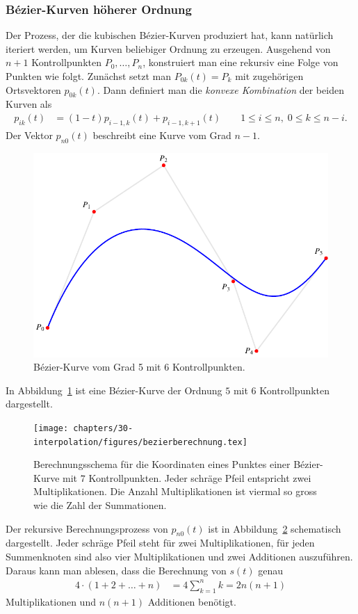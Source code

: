 \subsubsection{Bézier-Kurven höherer Ordnung}
%
Der Prozess, der die kubischen Bézier-Kurven produziert hat, kann natürlich
iteriert werden, um Kurven beliebiger Ordnung zu erzeugen.
Ausgehend von $n+1$ Kontrollpunkten $P_0,\dots,P_n$, konstruiert man eine
rekursiv eine Folge von Punkten wie folgt.
Zunächst setzt man $P_{0k}(t) = P_k$ mit zugehörigen Ortsvektoren $p_{0k}(t)$.
Dann definiert man die {\em konvexe Kombination} der beiden Kurven als
\begin{align*}
p_{ik}(t) &= (1-t)  p_{i-1,k}(t) + p_{i-1,k+1}(t)
\qquad
1\le i \le n,\; 
0\le k\le n - i.
\end{align*}
Der Vektor $p_{n0}(t)$ beschreibt eine Kurve vom Grad $n-1$.
\begin{figure}
\centering
\includegraphics{chapters/30-interpolation/figures/beziern.pdf}
\caption{Bézier-Kurve vom Grad 5 mit 6 Kontrollpunkten.
\label{buch:bezier:figure:beziern}}
\end{figure}
In Abbildung~\ref{buch:bezier:figure:beziern} ist eine Bézier-Kurve
der Ordnung $5$ mit 6 Kontrollpunkten dargestellt.

\begin{figure}
\centering
\texttt{[image: chapters/30-interpolation/figures/bezierberechnung.tex]}
\caption{Berechnungsschema für die Koordinaten eines Punktes einer Bézier-Kurve
mit $7$ Kontrollpunkten.
Jeder schräge Pfeil entspricht zwei Multiplikationen.
Die Anzahl Multiplikationen ist viermal so gross wie die Zahl der Summationen.
\label{buch:bezier:figure:bezierberechnung}}
\end{figure}
Der rekursive Berechnungsprozess von $p_{n0}(t)$ ist in
Abbildung~\ref{buch:bezier:figure:bezierberechnung} schematisch
dargestellt.
Jeder schräge Pfeil steht für zwei Multiplikationen,
für jeden Summenknoten sind also vier Multiplikationen und zwei Additionen
auszuführen.
Daraus kann man ablesen, dass die Berechnung von $s(t)$ genau
\begin{align}
4\cdot (1 + 2 + \dots + n) &= 4\sum_{k=1}^n k = 2n(n+1)
\label{buch:bezier:eqn:multiplikationen}
\end{align}
Multiplikationen und $n(n+1)$ Additionen benötigt.

